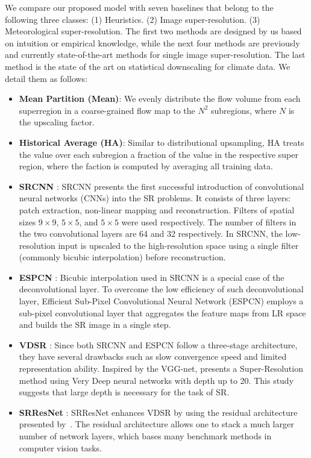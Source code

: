 We compare our proposed model with seven baselines that belong to the following three classes: (1) Heuristics. (2) Image super-resolution. (3) Meteorological super-resolution. The first two methods are designed by us based on intuition or empirical knowledge, while the next four methods are previously and currently state-of-the-art methods for single image super-resolution. The last method is the state of the art on statistical downscaling for climate data. We detail them as follows:

\begin{itemize}[leftmargin=*]
  \item \textbf{Mean Partition (Mean)}: We evenly distribute the flow volume from each superregion in a coarse-grained flow map to the $N^2$ subregions, where $N$ is the upscaling factor.
  \item \textbf{Historical Average (HA)}: Similar to distributional upsampling, HA treats the value over each subregion a fraction of the value in the respective super region, where the faction is computed by averaging all training data.
  \item \textbf{SRCNN} \cite{dong2016srcnn}: SRCNN presents the first successful introduction of convolutional neural networks (CNNs) into the SR problems. It consists of three layers: patch extraction, non-linear mapping and reconstruction. Filters of spatial sizes $9 \times 9$, $5 \times 5$, and $5 \times 5$ were used respectively. The number of filters in the two convolutional layers are 64 and 32 respectively. In SRCNN, the low-resolution input is upscaled to the high-resolution space using a single filter (commonly bicubic interpolation) before reconstruction.
  \item \textbf{ESPCN} \cite{shi2016espcn}: Bicubic interpolation used in SRCNN is a special case of the deconvolutional layer. To overcome the low efficiency of such deconvolutional layer, Efficient Sub-Pixel Convolutional Neural Network (ESPCN) employs a sub-pixel convolutional layer that aggregates the feature maps from LR space and builds the SR image in a single step.
  \item \textbf{VDSR} \cite{kim2016vdsr}: Since both SRCNN and ESPCN follow a three-stage architecture, they have several drawbacks such as slow convergence speed and limited representation ability. Inspired by the VGG-net, \citeauthor{kim2016vdsr} presents a Super-Resolution method using Very Deep neural networks with depth up to 20. This study suggests that large depth is necessary for the task of SR.
  \item \textbf{SRResNet} \cite{ledig2017srgan}: SRResNet enhances VDSR by using the residual architecture presented by~\citeauthor{he2016deep}\cite{he2016deep}. The residual architecture allows one to stack a much larger number of network layers, which bases many benchmark methods in computer vision tasks.

\end{itemize}
